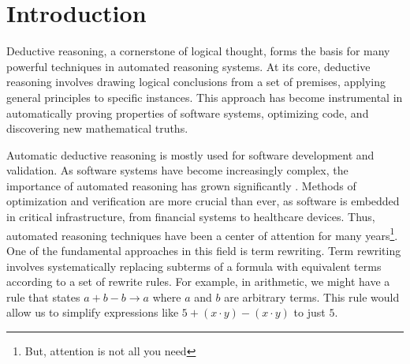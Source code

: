 \chapter{Introduction}
\label{chap:intro}




Deductive reasoning, a cornerstone of logical thought, forms the basis for many powerful techniques in automated reasoning systems. 
At its core, deductive reasoning involves drawing logical conclusions from a set of premises, applying general principles to specific instances. 
This approach has become instrumental in automatically proving properties of software systems, optimizing code, and discovering new mathematical truths.

Automatic deductive reasoning is mostly used for software development and validation.
As software systems have become increasingly complex, the importance of automated reasoning has grown significantly \cite{d2008survey}. 
Methods of optimization and verification are more crucial than ever, as software is embedded in critical infrastructure, from financial systems to healthcare devices.
Thus, automated reasoning techniques have been a center of attention for many years\footnote{But, attention is not all you need}. 
One of the fundamental approaches in this field is term rewriting. 
Term rewriting involves systematically replacing subterms of a formula with equivalent terms according to a set of rewrite rules. 
For example, in arithmetic, we might have a rule that states $a + b - b \rightarrow a$ where $a$ and $b$ are arbitrary terms. 
This rule would allow us to simplify expressions like $5 + (x\cdot y) - (x\cdot y)$ to just $5$.

